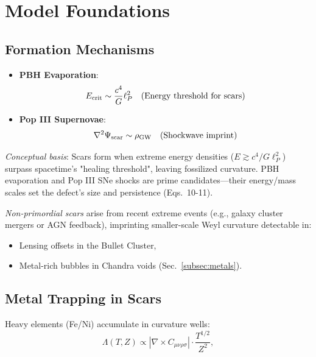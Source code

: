 \documentclass{article}
\begin{document}
\section{Model Foundations}
\subsection{Formation Mechanisms}
\FloatBarrier
\begin{itemize}
    \item \textbf{PBH Evaporation}: 
        \begin{equation}
        E_{\rm crit} \sim \frac{c^4}{G} \ell_P^2 \quad (\text{Energy threshold for scars})
        \end{equation}
    \item \textbf{Pop III Supernovae}:
        \begin{equation}
        \nabla^2 \Psi_{\rm scar} \sim \rho_{\rm GW} \quad (\text{Shockwave imprint})
        \end{equation}
\end{itemize}

\textit{Conceptual basis}: Scars form when extreme energy densities ($E \gtrsim c^4/G\ell_P^2$) surpass spacetime's "healing threshold", leaving fossilized curvature. PBH evaporation and Pop III SNe shocks are prime candidates—their energy/mass scales set the defect's size and persistence (Eqs.~10-11). \\ \par

\textit{Non-primordial scars} arise from recent extreme events (e.g., galaxy cluster mergers or AGN feedback), imprinting smaller-scale Weyl curvature detectable in:  
\begin{itemize}  
    \item Lensing offsets in the Bullet Cluster,  
    \item Metal-rich bubbles in Chandra voids (Sec.~\ref{subsec:metals}).  
\end{itemize}  


\subsection{Metal Trapping in Scars}
Heavy elements (Fe/Ni) accumulate in curvature wells:
\begin{equation}\label{eq:metal_trapping} 
    \Lambda(T,Z) \propto \left| \nabla \times C_{\mu\nu\rho\sigma} \right| \cdot \frac{T^{1/2}}{Z^2},
\end{equation}
\end{document}
